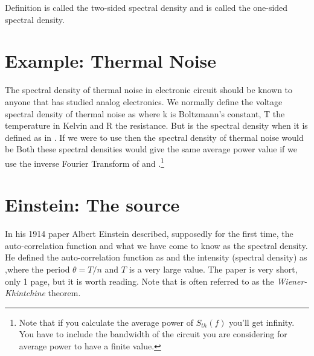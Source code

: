 \documentclass[final,a4paper]{IEEEtran}
\begin{document}
Definition  is  called the two-sided spectral density
and  is called the one-sided spectral density.

\section{Example: Thermal Noise}
The spectral density of thermal noise in electronic circuit should be
known to anyone that has studied analog electronics. We normally
define the voltage spectral density of thermal noise as
where k is Boltzmann's constant, T the temperature in Kelvin and R the
resistance. But  is the spectral density when it is
defined as in . If we were to use  then the
spectral density of thermal noise would be
Both these spectral densities would give the same average power
value if we use the inverse Fourier Transform of  and
.\footnote{Note that if you calculate the average power of
  $S_{th}(f)$ you'll get infinity. You have to include the bandwidth of
  the circuit you are considering for average power to have a finite value.}

\section{Einstein: The source}
In his 1914 paper \cite{einstein14} Albert Einstein described,
supposedly for the first time, the auto-correlation function and
what we have come to know as the spectral density. He defined the
auto-correlation function as
and the intensity (spectral density) as
,where the period $\theta = T/n$ and $T$ is a very large value. The
paper is very short, only 1 page, but it is worth reading. Note that
 is often referred to as the {\em Wiener-Khintchine}  theorem.



%
\end{document}
